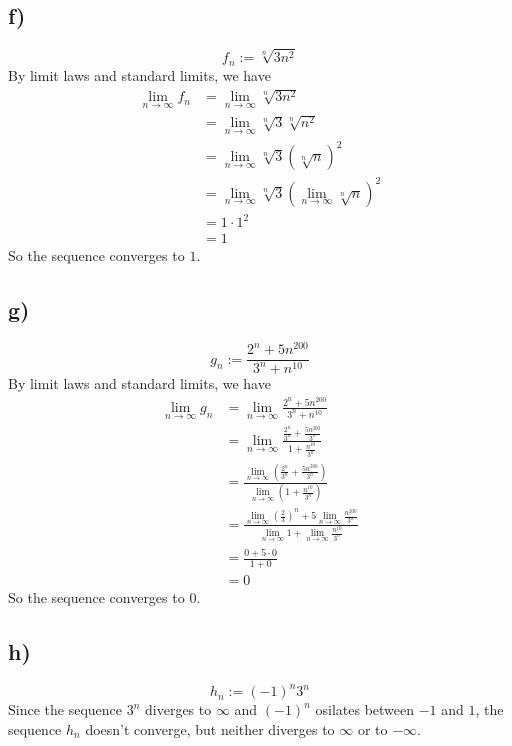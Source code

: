 \documentclass{article}
\newcommand{\limn}{\lim_{n\to\infty}}
\theoremstyle{mytheoremstyle}
\theoremstyle{mytheoremstyle}
\theoremstyle{myproblemstyle}
\begin{document}
    \subsection{f)}
    $$f_n := \sqrt[n]{3n^2}$$
    By limit laws and standard limits, we have
        \begin{align*}
            \limn{f_n} &= \limn{\sqrt[n]{3n^2}} \\
            &= \limn{\sqrt[n]{3}\sqrt[n]{n^2}} \\
            &= \limn{\sqrt[n]{3}(\sqrt[n]{n})^2} \\
            &= \limn{\sqrt[n]{3}}(\limn{\sqrt[n]{n}})^2 \\
            &= 1 \cdot 1^2 \\
            &= 1
        \end{align*}
        So the sequence converges to $1$.
    \subsection{g)}
    $$g_n := \frac{2^n + 5n^200}{3^n+n^10}$$
    By limit laws and standard limits, we have
        \begin{align*}
            \limn{g_n} &= \limn{\frac{2^n + 5n^{200}}{3^n+n^{10}}} \\
            &= \limn{\frac{\frac{2^n}{3^n} + \frac{5n^{200}}{3^n}}{1+\frac{n^{10}}{3^n}}} \\
            &= \frac{\limn{(\frac{2^n}{3^n} + \frac{5n^{200}}{3^n})}}{\limn{(1+\frac{n^{10}}{3^n})}} \\
            &= \frac{\limn{(\frac{2}{3})^n + 5\limn{\frac{n^{200}}{3^n}}}}{\limn{1}+\limn{\frac{n^{10}}{3^n}}} \\
            &= \frac{0 + 5\cdot 0}{1+0} \\
            &= 0
        \end{align*}
        So the sequence converges to $0$.
    \subsection{h)}
    $$h_n := (-1)^n3^n$$
        Since the sequence $3^n$ diverges to $\infty$ and $(-1)^n$ osilates between $-1$ and $1$, the sequence $h_n$ doesn't converge, but neither diverges to $\infty$ or to $-\infty$.
\end{document}
